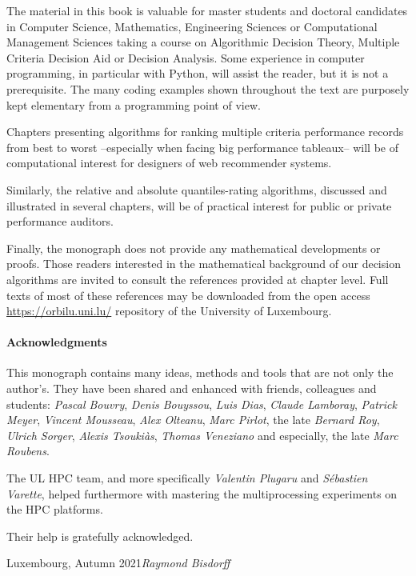 
The material in this book is valuable for master students and doctoral candidates in Computer Science, Mathematics, Engineering Sciences or Computational Management Sciences taking a course on Algorithmic Decision Theory, Multiple Criteria Decision Aid or Decision Analysis. Some experience in computer programming, in particular with Python, will assist the reader, but it is not a prerequisite. The many coding examples shown throughout the text are purposely kept elementary from a programming point of view. 

Chapters presenting algorithms for ranking multiple criteria performance records from best to worst --especially when facing big performance tableaux-- will be of computational interest for designers of web recommender systems. 

Similarly, the relative and absolute quantiles-rating algorithms, discussed and illustrated in several chapters, will be of practical interest for public or private performance auditors.

Finally, the monograph does not provide any mathematical developments or proofs. Those readers interested in the mathematical background of our decision algorithms are invited to consult the references provided at chapter level. Full texts of most of these references may be downloaded from the open access \href{https://orbilu.uni.lu/}{https://orbilu.uni.lu/} repository of the University of Luxembourg. 

\pagebreak

\paragraph{\textbf{Acknowledgments}}

This monograph contains many ideas, methods and tools that are not only the author’s. They have been shared and enhanced with friends, colleagues and students: \emph{Pascal Bouvry}, \emph{Denis Bouyssou}, \emph{Luis Dias}, \emph{Claude Lamboray}, \emph{Patrick Meyer}, \emph{Vincent Mousseau}, \emph{Alex Olteanu}, \emph{Marc Pirlot}, the late \emph{Bernard Roy}, \emph{Ulrich Sorger}, \emph{Alexis Tsouki\`as}, \emph{Thomas Veneziano} and especially, the late \emph{Marc Roubens}.

The UL HPC team, and more specifically \emph{Valentin Plugaru} and \emph{Sébastien Varette}, helped furthermore with mastering the multiprocessing experiments on the HPC platforms.

Their help is gratefully acknowledged.

\vspace{\baselineskip}
\begin{flushright}\noindent
Luxembourg, Autumn 2021\hfill \emph{Raymond Bisdorff}\\
\end{flushright}



